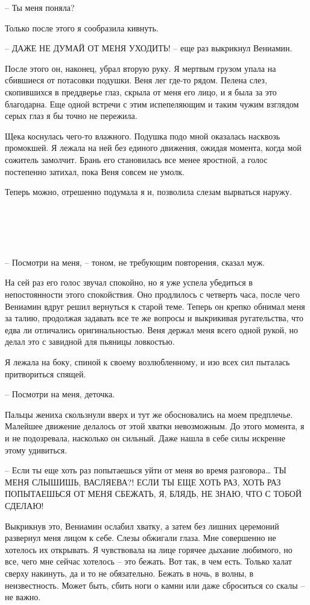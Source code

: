 \documentclass[
]{book}
\begin{document}
-- Ты меня поняла?

Только после этого я сообразила кивнуть.

-- ДАЖЕ НЕ ДУМАЙ ОТ МЕНЯ УХОДИТЬ! -- еще раз выкрикнул Вениамин.

После этого он, наконец, убрал вторую руку. Я мертвым грузом упала на сбившиеся от потасовки подушки. Веня лег где-то рядом. Пелена слез, скопившихся в преддверье глаз, скрыла от меня его лицо, и я была за это благодарна. Еще одной встречи с этим испепеляющим и таким чужим взглядом серых глаз я бы точно не пережила.

Щека коснулась чего-то влажного. Подушка подо мной оказалась насквозь промокшей. Я лежала на ней без единого движения, ожидая момента, когда мой сожитель замолчит. Брань его становилась все менее яростной, а голос постепенно затихал, пока Веня совсем не умолк.

Теперь можно, отрешенно подумала я и, позволила слезам вырваться наружу.

\hypertarget{chapter-54}{%
\chapter{~}\label{chapter-54}}

-- Посмотри на меня, -- тоном, не требующим повторения, сказал муж.

На сей раз его голос звучал спокойно, но я уже успела убедиться в непостоянности этого спокойствия. Оно продлилось с четверть часа, после чего Вениамин вдруг решил вернуться к старой теме. Теперь он крепко обнимал меня за талию, продолжая задавать все те же вопросы и выкрикивая ругательства, что едва ли отличались оригинальностью. Веня держал меня всего одной рукой, но делал это с завидной для пьяницы ловкостью.

Я лежала на боку, спиной к своему возлюбленному, и изо всех сил пыталась притвориться спящей.

-- Посмотри на меня, деточка.

Пальцы жениха скользнули вверх и тут же обосновались на моем предплечье. Малейшее движение делалось от этой хватки невозможным. До этого момента, я и не подозревала, насколько он сильный. Даже нашла в себе силы искренне этому удивиться.

-- Если ты еще хоть раз попытаешься уйти от меня во время разговора\ldots{} ТЫ МЕНЯ СЛЫШИШЬ, ВАСЛЯЕВА?! ЕСЛИ ТЫ ЕЩЕ ХОТЬ РАЗ, ХОТЬ РАЗ ПОПЫТАЕШЬСЯ ОТ МЕНЯ СБЕЖАТЬ, Я, БЛЯДЬ, НЕ ЗНАЮ, ЧТО С ТОБОЙ СДЕЛАЮ!

Выкрикнув это, Вениамин ослабил хватку, а затем без лишних церемоний развернул меня лицом к себе. Слезы обжигали глаза. Мне совершенно не хотелось их открывать. Я чувствовала на лице горячее дыхание любимого, но все, чего мне сейчас хотелось -- это бежать. Вот так, в чем есть. Только халат сверху накинуть, да и то не обязательно. Бежать в ночь, в волны, в неизвестность. Может быть, сбить ноги о камни или даже сброситься со скалы -- не важно.
\end{document}
